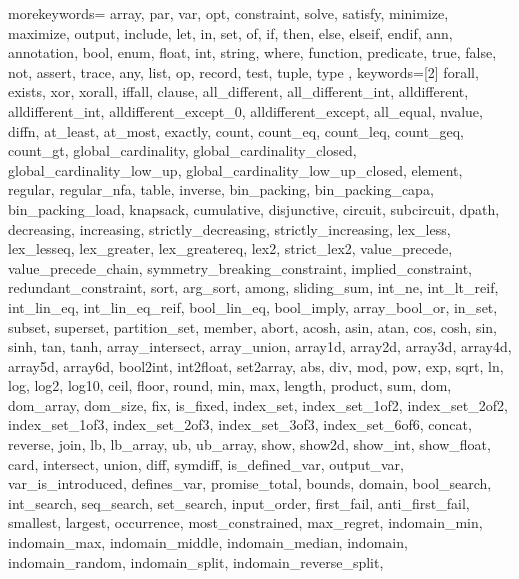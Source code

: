 \usepackage{listings}
\usepackage{courier} %

\newcommand\mznfont{\fontfamily{pcr}\selectfont}

{
  morekeywords={
  array, par, var, opt, constraint, solve, satisfy, minimize,
  maximize, output, include, let, in, set, of, if, then, else, elseif, endif,
  ann, annotation, bool, enum, float, int, string, where, function,
  predicate, true, false, not, assert, trace,
  any, list, op, record, test, tuple, type
  },
  keywords=[2]{
  forall, exists, xor, xorall, iffall, clause,
  all_different, all_different_int, alldifferent, alldifferent_int,
  alldifferent_except_0, alldifferent_except, all_equal,
  nvalue, diffn,
  at_least, at_most, exactly, %
  count, count_eq, count_leq, count_geq, count_gt,
  global_cardinality, global_cardinality_closed,
  global_cardinality_low_up, global_cardinality_low_up_closed,
  element, regular, regular_nfa, table, inverse,
  bin_packing, bin_packing_capa, bin_packing_load, knapsack,
  cumulative, disjunctive, circuit, subcircuit, dpath,
  decreasing, increasing,
  strictly_decreasing, strictly_increasing, %
  lex_less, lex_lesseq, lex_greater, lex_greatereq, lex2, strict_lex2,
  value_precede, value_precede_chain,
  symmetry_breaking_constraint, implied_constraint, redundant_constraint,
  sort, arg_sort, among, sliding_sum,
  int_ne, int_lt_reif, int_lin_eq, int_lin_eq_reif, bool_lin_eq,
  bool_imply, array_bool_or,
  in_set, subset, superset, partition_set, member,
  abort,
  acosh, asin, atan, cos, cosh, sin, sinh, tan, tanh,
  array_intersect, array_union,
  array1d, array2d, array3d, array4d, array5d, array6d,
  bool2int, int2float, set2array,
  abs, div, mod, pow, exp, sqrt, ln, log, log2, log10,
  ceil, floor, round,
  min, max, length, product, sum,
  dom, dom_array, dom_size, fix, is_fixed,
  index_set, index_set_1of2, index_set_2of2,
  index_set_1of3, index_set_2of3, index_set_3of3, index_set_6of6,
  concat, reverse, join,
  lb, lb_array, ub, ub_array,
  show, show2d, show_int, show_float,
  card, intersect, union, diff, symdiff,
  is_defined_var, output_var, var_is_introduced, defines_var,
  promise_total, bounds, domain, bool_search, int_search, seq_search,
  set_search, input_order, first_fail, anti_first_fail, smallest,
  largest, occurrence, most_constrained, max_regret, indomain_min,
  indomain_max, indomain_middle, indomain_median, indomain,
  indomain_random, indomain_split, indomain_reverse_split,
}}
